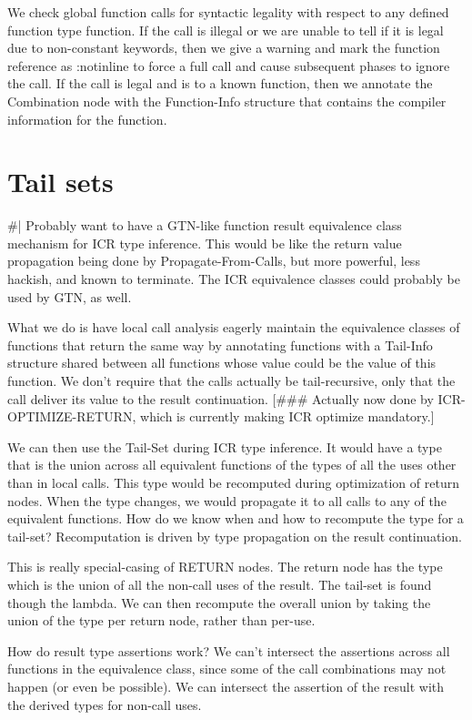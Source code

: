 We check global function calls for syntactic legality with respect to any
defined function type function.  If the call is illegal or we are unable to
tell if it is legal due to non-constant keywords, then we give a warning and
mark the function reference as :notinline to force a full call and cause
subsequent phases to ignore the call.  If the call is legal and is to a known
function, then we annotate the Combination node with the Function-Info
structure that contains the compiler information for the function.

\section{Tail sets}
\#|
Probably want to have a GTN-like function result equivalence class mechanism
for ICR type inference.  This would be like the return value propagation being
done by Propagate-From-Calls, but more powerful, less hackish, and known to
terminate.  The ICR equivalence classes could probably be used by GTN, as well.

What we do is have local call analysis eagerly maintain the equivalence classes
of functions that return the same way by annotating functions with a Tail-Info
structure shared between all functions whose value could be the value of this
function.  We don't require that the calls actually be tail-recursive, only
that the call deliver its value to the result continuation.  [\#\#\# Actually
now done by ICR-OPTIMIZE-RETURN, which is currently making ICR optimize
mandatory.]

We can then use the Tail-Set during ICR type inference.  It would have a type
that is the union across all equivalent functions of the types of all the uses
other than in local calls.  This type would be recomputed during optimization
of return nodes.  When the type changes, we would propagate it to all calls to
any of the equivalent functions.  How do we know when and how to recompute the
type for a tail-set?  Recomputation is driven by type propagation on the result
continuation.

This is really special-casing of RETURN nodes.  The return node has the type
which is the union of all the non-call uses of the result.  The tail-set is
found though the lambda.  We can then recompute the overall union by taking the
union of the type per return node, rather than per-use.


How do result type assertions work?  We can't intersect the assertions across
all functions in the equivalence class, since some of the call combinations may
not happen (or even be possible).  We can intersect the assertion of the result
with the derived types for non-call uses.

